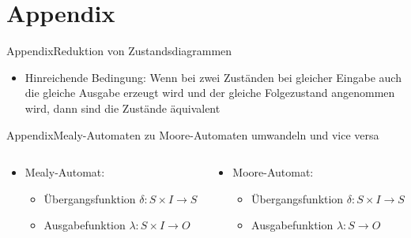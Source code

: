 
\section{Appendix}

\setcounter{exercise}{1}

\begin{frame}{Appendix}{Reduktion von Zustandsdiagrammen}
  \begin{itemize}
    \item \alert{Hinreichende Bedingung:} Wenn bei zwei Zuständen bei gleicher Eingabe auch die gleiche Ausgabe erzeugt wird und der gleiche Folgezustand angenommen wird, dann sind die Zustände äquivalent
  \end{itemize}
\end{frame}

\begin{frame}{Appendix}{Mealy-Automaten zu Moore-Automaten umwandeln und vice versa}
  \begin{columns}
    \begin{column}{0.45\textwidth}
      \begin{itemize}
        \item \alert{Mealy-Automat:}
        \begin{itemize}
          \item \alert{Übergangsfunktion} $\delta: S \times I \rightarrow S$
          \item \alert{Ausgabefunktion} $\lambda: S \times I \rightarrow O$
        \end{itemize}
      \end{itemize}
    \end{column}
    \begin{column}{0.55\textwidth}
      \begin{itemize}
        \item \alert{Moore-Automat:}
        \begin{itemize}
          \item \alert{Übergangsfunktion} $\delta: S \times I \rightarrow S$
          \item \alert{Ausgabefunktion} $\lambda: S \rightarrow O$
        \end{itemize}
      \end{itemize}
    \end{column}
  \end{columns}
\end{frame}

